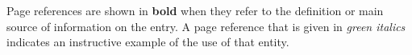 \documentclass[10pt,twoside,english,pdftex]{article}
\begin{document}
\T\twocolumn
%
\texonly{\section*{\indexname}}%
% 
Page references are shown in \textbf{bold} when they refer to the definition
or main source of information on the entry. A page reference that is given in
\textit{\textcolor{verydarkgreen}{green italics}\/} indicates an instructive
example of the use of that entity.
%
\W\\~\\
\T\bigskip
%
\texorhtml{}{\htmlprintindex}

\end{document}
